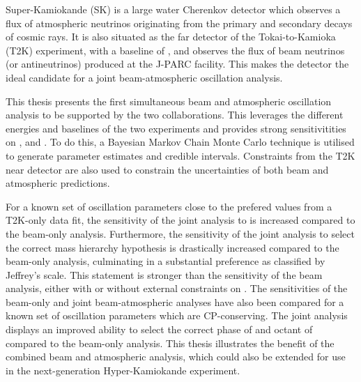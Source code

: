 Super-Kamiokande (SK) is a large water Cherenkov detector which observes a flux of atmospheric neutrinos originating from the primary and secondary decays of cosmic rays. It is also situated as the far detector of the Tokai-to-Kamioka (T2K) experiment, with a baseline of , and observes the flux of beam neutrinos (or antineutrinos) produced at the J-PARC facility. This makes the detector the ideal candidate for a joint beam-atmospheric oscillation analysis.

This thesis presents the first simultaneous beam and atmospheric oscillation analysis to be supported by the two collaborations. This leverages the different energies and baselines of the two experiments and provides strong sensitivitities on ,  and . To do this, a Bayesian Markov Chain Monte Carlo technique is utilised to generate parameter estimates and credible intervals. Constraints from the T2K near detector are also used to constrain the uncertainties of both beam and atmospheric predictions.

For a known set of oscillation parameters close to the prefered values from a T2K-only data fit, the sensitivity of the joint analysis to  is increased compared to the beam-only analysis. Furthermore, the sensitivity of the joint analysis to select the correct mass hierarchy hypothesis is drastically increased compared to the beam-only analysis, culminating in a substantial preference as classified by Jeffrey's scale. This statement is stronger than the sensitivity of the beam analysis, either with or without external constraints on . The sensitivities of the beam-only and joint beam-atmospheric analyses have also been compared for a known set of oscillation parameters which are CP-conserving. The joint analysis displays an improved ability to select the correct phase of  and octant of  compared to the beam-only analysis. This thesis illustrates the benefit of the combined beam and atmospheric analysis, which could also be extended for use in the next-generation Hyper-Kamiokande experiment.
